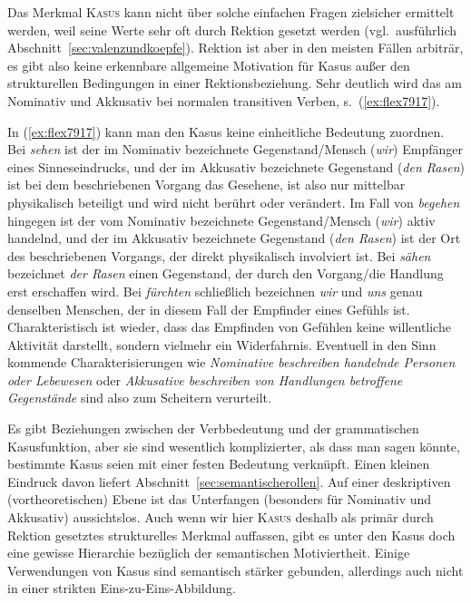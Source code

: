 Das Merkmal \textsc{Kasus} kann nicht über solche einfachen Fragen zielsicher ermittelt werden, weil seine Werte sehr oft durch Rektion gesetzt werden (vgl.\ ausführlich Abschnitt~\ref{sec:valenzundkoepfe}).
Rektion ist aber in den meisten Fällen arbiträr, es gibt also keine erkennbare allgemeine Motivation für Kasus außer den strukturellen Bedingungen in einer Rektionsbeziehung.
Sehr deutlich wird das am Nominativ und Akkusativ bei normalen transitiven Verben, s.\ (\ref{ex:flex7917}).

\begin{exe}
  \ex \label{ex:flex7917}
  \begin{xlist}
  \end{xlist}
\end{exe}


In (\ref{ex:flex7917}) kann man den Kasus keine einheitliche Bedeutung zuordnen.
Bei \textit{sehen} ist der im Nominativ bezeichnete Gegenstand\slash Mensch (\textit{wir}) Empfänger eines Sinneseindrucks, und der im Akkusativ bezeichnete Gegenstand (\textit{den Rasen}) ist bei dem beschriebenen Vorgang das Gesehene, ist also nur mittelbar physikalisch beteiligt und wird nicht berührt oder verändert.
Im Fall von \textit{begehen} hingegen ist der vom Nominativ bezeichnete Gegenstand\slash Mensch (\textit{wir}) aktiv handelnd, und der im Akkusativ bezeichnete Gegenstand (\textit{den Rasen}) ist der Ort des beschriebenen Vorgangs, der direkt physikalisch involviert ist.
Bei \textit{sähen} bezeichnet \textit{der Rasen} einen Gegenstand, der durch den Vorgang\slash die Handlung erst erschaffen wird.
Bei \textit{fürchten} schließlich bezeichnen \textit{wir} und \textit{uns} genau denselben Menschen, der in diesem Fall der Empfinder eines Gefühls ist.
Charakteristisch ist wieder, dass das Empfinden von Gefühlen keine willentliche Aktivität darstellt, sondern vielmehr ein Widerfahrnis.
Eventuell in den Sinn kommende Charakterisierungen wie \textit{Nominative beschreiben handelnde Personen oder Lebewesen} oder \textit{Akkusative beschreiben von Handlungen betroffene Gegenstände} sind also zum Scheitern verurteilt.

Es gibt Beziehungen zwischen der Verbbedeutung und der grammatischen Kasusfunktion, aber sie sind wesentlich komplizierter, als dass man sagen könnte, bestimmte Kasus seien mit einer festen Bedeutung verknüpft.
Einen kleinen Eindruck davon liefert Abschnitt~\ref{sec:semantischerollen}.
Auf einer deskriptiven (vortheoretischen) Ebene ist das Unterfangen (besonders für Nominativ und Akkusativ) aussichtslos.
Auch wenn wir hier \textsc{Kasus} deshalb als primär durch Rektion gesetztes strukturelles Merkmal auffassen, gibt es unter den Kasus doch eine gewisse Hierarchie bezüglich der semantischen Motiviertheit.
Einige Verwendungen von Kasus sind semantisch stärker gebunden, allerdings auch nicht in einer strikten Eins-zu-Eins-Abbildung.

